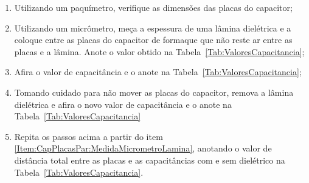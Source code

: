 \begin{enumerate}
	\item Utilizando um paquímetro, verifique as dimensões das placas do capacitor;
	\item Utilizando um micrômetro, meça a espessura de uma lâmina dielétrica e a coloque entre as placas do capacitor de formaque que não reste ar entre as placas e a lâmina. Anote o valor obtido na Tabela~\ref{Tab:ValoresCapacitancia};\label{Item:CapPlacasPar:MedidaMicrometroLamina}
	\item Afira o valor de capacitância e o anote na Tabela~\ref{Tab:ValoresCapacitancia};
	\item Tomando cuidado para não mover as placas do capacitor, remova a lâmina dielétrica e afira o novo valor de capacitância e o anote na Tabela~\ref{Tab:ValoresCapacitancia}
	\item Repita os passos acima a partir do item \ref{Item:CapPlacasPar:MedidaMicrometroLamina}, anotando o valor de distância total entre as placas e as capacitâncias com e sem dielétrico na Tabela~\ref{Tab:ValoresCapacitancia}.
\end{enumerate}

\cleardoublepage


\vspace{15mm}

\begin{fullwidth}
\noindent{}
\vspace{5mm}

\noindent{}

\noindent{}

\noindent{}

\noindent{}

\noindent{}
\end{fullwidth}

